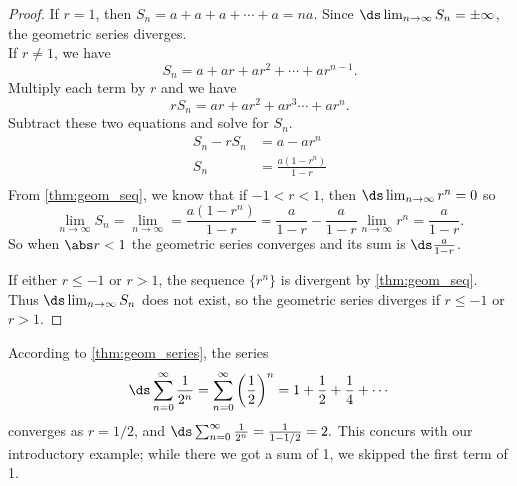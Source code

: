 \begin{proof}
If $r=1$, then $S_n=a+a+a+\dotsb+a=na$. Since $\ds\lim_{n\to \infty} S_n=\pm \infty$, the geometric series diverges.\\
If $r\neq 1$, we have
\[S_n=a+ar+ar^2+\dotsb+ar^{n-1}.\]
Multiply each term by $r$ and we have 
\[rS_n=ar+ar^2+ar^3\dotsb+ar^n.\]
Subtract these two equations and solve for $S_n$.
\begin{align*}
S_n-rS_n &=a-ar^n \\
S_n &=\frac{a(1-r^n)}{1-r}\\
\end{align*}
From \autoref{thm:geom_seq}, we know that if $-1<r<1$, then $\ds \lim_{n\to \infty} r^n=0$ so
\[
\lim_{n\to \infty} S_n=\lim_{n\to \infty}=\frac{a(1-r^n)}{1-r}
=\frac{a}{1-r}- \frac{a}{1-r}\lim_{n\to \infty}r^n=\frac{a}{1-r}.
\]
So when $\abs r<1$ the geometric series converges and its sum is $\ds \frac{a}{1-r}$.

If either $r\leq -1$ or $r>1$, the sequence $\{r^n\}$ is divergent by \autoref{thm:geom_seq}. Thus $\ds \lim_{n\to \infty} S_n$ does not exist, so the geometric series diverges if $r\leq -1$ or \mbox{$r>1$.}
\end{proof}

According to \autoref{thm:geom_series}, the series 
\[
\ds\sum_{n=0}^\infty \frac{1}{2^n}
=\sum_{n=0}^\infty \left(\frac 12\right)^n= 1+\frac12+\frac14+\dotsb
\]
converges as $r=1/2$, and $\ds \sum_{n=0}^\infty \frac{1}{2^n} = \frac{1}{1-1/2} = 2.$ This concurs with our introductory example; while there we got a sum of 1, we skipped the first term of 1.\\

